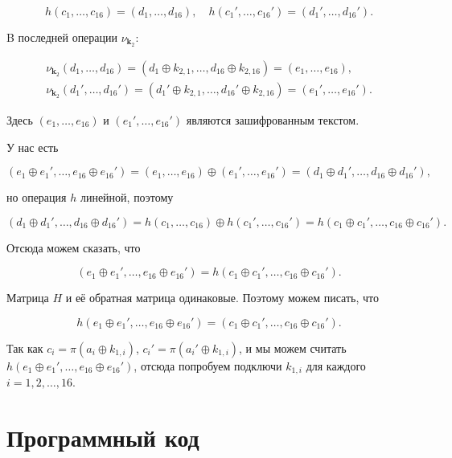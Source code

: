 \documentclass{article}
\begin{document}
$$h(c_1, \ldots, c_{16}) = (d_1, \ldots, d_{16}), \quad h(c_1', \ldots, c_{16}') = (d_1', \ldots, d_{16}').$$

B последней операции $\nu_{\bm{k}_2}$:

\[\begin{split}
    \nu_{\bm{k}_2}(d_1, \ldots, d_{16}) = (d_1 \oplus k_{2, 1}, \ldots, d_{16} \oplus k_{2, 16}) = (e_1, \ldots, e_{16}), \\
    \nu_{\bm{k}_2}(d_1', \ldots, d_{16}') = (d_1' \oplus k_{2, 1}, \ldots, d_{16}' \oplus k_{2, 16}) = (e_1', \ldots, e_{16}').
\end{split}\]

Здесь $(e_1, \ldots, e_{16})$ и $(e_1', \ldots, e_{16}')$ являются зашифрованным текстом.

У нас есть

$$(e_1 \oplus e_1', \ldots, e_{16} \oplus e_{16}') = (e_1, \ldots, e_{16}) \oplus (e_1', \ldots, e_{16}') = (d_1 \oplus d_1', \ldots, d_{16} \oplus d_{16}'),$$

но операция $h$ линейной, поэтому

$$(d_1 \oplus d_1', \ldots, d_{16} \oplus d_{16}') = h(c_1, \ldots, c_{16}) \oplus h(c_1', \ldots, c_{16}') = h(c_1 \oplus c_1', \ldots, c_{16} \oplus c_{16}').$$

Отсюда можем сказать, что

$$(e_1 \oplus e_1', \ldots, e_{16} \oplus e_{16}') = h(c_1 \oplus c_1', \ldots, c_{16} \oplus c_{16}').$$

Матрица $H$ и её обратная матрица одинаковые. Поэтому можем писать, что

$$h(e_1 \oplus e_1', \ldots, e_{16} \oplus e_{16}') = (c_1 \oplus c_1', \ldots, c_{16} \oplus c_{16}').$$

Так как $c_i = \pi(a_i \oplus k_{1,i})$, $c_i' = \pi(a_i' \oplus k_{1,i})$, и мы можем считать $h(e_1 \oplus e_1', \ldots, e_{16} \oplus e_{16}')$, отсюда попробуем подключи $k_{1, i}$ для каждого $i = 1, 2, \ldots, 16$.

\section{Программный код}
\end{document}
